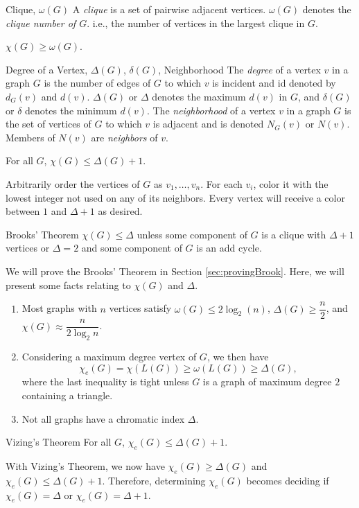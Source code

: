 \begin{df}{Clique, $\omega(G)$}
	A \textit{clique} is a set of pairwise adjacent vertices. $\omega(G)$ denotes the \textit{clique number of $G$}. i.e., the number of vertices in the largest clique in $G$.
\end{df}
\begin{cor}{}
	$\chi(G)\geq\omega(G)$.	
\end{cor}
\begin{df}{Degree of a Vertex, $\Delta(G)$, $\delta(G)$, Neighborhood}
	The \textit{degree} of a vertex $v$ in a graph $G$ is the number of edges of $G$ to which $v$ is incident and id denoted by $d_G(v)$ and $d(v)$. $\Delta(G)$ or $\Delta$ denotes the maximum $d(v)$ in $G$, and $\delta(G)$ or $\delta$ denotes the minimum $d(v)$. The \textit{neighborhood} of a vertex $v$ in a graph $G$ is the set of vertices of $G$ to which $v$ is adjacent and is denoted $N_G(v)$ or $N(v)$. Members of $N(v)$ are \textit{neighbors} of $v$.
\end{df}
\begin{lem}{}
	For all $G$, $\chi(G)\leq\Delta(G)+1$.	
\end{lem}
\begin{prf}
	Arbitrarily order the vertices of $G$ as $v_1,\dots,v_n$. For each $v_i$, color it with the lowest integer not used on any of its neighbors. Every vertex will receive a color between $1$ and $\Delta+1$ as desired. 
\end{prf}
\begin{thm}{Brooks' Theorem}
	$\chi(G)\leq\Delta$ unless some component of $G$ is a clique with $\Delta+1$ vertices or $\Delta=2$ and some component of $G$ is an add cycle.	
\end{thm}
\begin{rmk}
	We will prove the Brooks' Theorem in Section \ref{sec:provingBrook}. Here, we will present some facts relating to $\chi(G)$ and $\Delta$.
	\begin{enumerate}
		\item Most graphs with $n$ vertices satisfy $\omega(G)\leq2\log_2(n)$, $\Delta(G)\geq\dfrac{n}{2}$, and $\chi(G)\approx\dfrac{n}{2\log_2n}$.
		\item Considering a maximum degree vertex of $G$, we then have \[\chi_e(G)=\chi(L(G))\geq\omega(L(G))\geq\Delta(G),\] where the last inequality is tight unless $G$ is a graph of maximum degree $2$ containing a triangle.
		\item Not all graphs have a chromatic index $\Delta$.
	\end{enumerate}
\end{rmk}
\begin{thm}{Vizing's Theorem}
	For all $G$, $\chi_e(G)\leq\Delta(G)+1$.	
\end{thm}
\begin{rmk}
	With Vizing's Theorem, we now have $\chi_e(G)\geq\Delta(G)$ and $\chi_e(G)\leq\Delta(G)+1$. Therefore, determining $\chi_e(G)$ becomes deciding if $\chi_e(G)=\Delta$ or $\chi_e(G)=\Delta+1$.	
\end{rmk}

